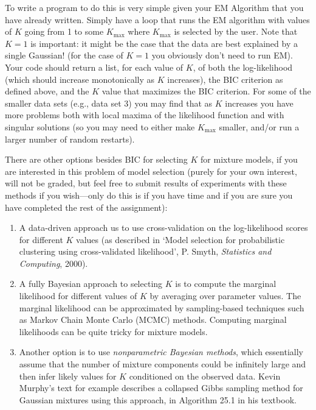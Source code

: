 \documentclass[11pt]{article}
\begin{document}
To write a program to do this is very simple given
your EM Algorithm  that you have
already written. Simply have a loop that runs the EM
algorithm with values of $K$ going from 1 to some $K_{\max}$
where $K_{\max}$ is selected by the user. Note that
$K=1$ is important: it might be the case that the data
are best explained by a single Gaussian! (for the case
of $K=1$ you obviously don't need to run EM). Your
code should return a list, for each value of $K$,
of both the log-likelihood (which should increase
monotonically as $K$ increases), the BIC criterion
as defined above, and the $K$ value that maximizes
the BIC criterion. For some of the smaller
data sets (e.g., data set 3) you may find
that as $K$ increases you have more problems both
with local maxima of the likelihood function and with
singular solutions (so you may need to either
make $K_{\max}$ smaller, and/or run a larger number of
random restarts).

There are other options besides BIC for selecting $K$ for mixture models, if  you are interested in this problem of model selection
(purely for your own interest, will not be graded, but feel free to submit results of experiments with these methods if you wish---only do this is if you have time and if you are sure you have completed the rest of the assignment):
\begin{enumerate}
\item A data-driven approach us to use cross-validation
on the log-likelihood scores for different $K$ values (as described in `Model selection for probabilistic clustering using cross-validated likelihood', P. Smyth, {\it Statistics and Computing}, 2000).
\item A fully Bayesian approach to selecting $K$ is to compute the marginal likelihood for different values of $K$ by averaging over parameter values. The marginal likelihood can be approximated by sampling-based techniques such as Markov Chain Monte Carlo (MCMC) methods. Computing marginal likelihoods can be quite tricky for mixture models.
\item Another option is to use {\it nonparametric Bayesian methods}, which essentially assume that the number of mixture components could be infinitely large and then infer likely values for  $K$ conditioned on the observed data.  Kevin Murphy's text for example describes a collapsed Gibbs sampling method for Gaussian mixtures using this approach, in Algorithm 25.1 in  his textbook.
\end{enumerate}
\end{document}
